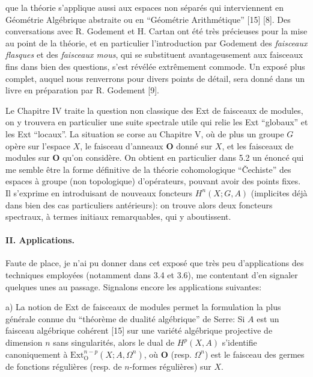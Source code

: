 
que la théorie s'applique aussi aux espaces non séparés qui interviennent en
Géométrie Algébrique abstraite ou en ``Géométrie Arithmétique'' [15] [8]. Des
conversations avec R. Godement et H. Cartan ont été très précieuses pour la
mise au point de la théorie, et en particulier l'introduction par Godement des
\emph{faisceaux flasques} et des \emph{faisceaux mous}, qui se substituent
avantageusement aux faisceaux fins dans bien des questions, s'est révélée
extrêmement commode. Un exposé plus complet, auquel nous renverrons pour divers
points de détail, sera donné dans un livre en préparation par R. Godement [9].

Le Chapitre IV traite la question non classique des Ext de faisceaux de
modules, on y trouvera en particulier une suite spectrale utile qui relie les
Ext ``globaux'' et les Ext ``locaux''.
La situation se corse au Chapitre V, où de plus un groupe $G$ opère sur
l'espace $X$, le faisceau d'anneaux $\mathbf{O}$ donné sur $X$, et les faisceaux de
modules sur $\mathbf{O}$ qu'on considère. On obtient en particulier dans 5.2 un énoncé
qui me semble être la forme définitive de la théorie cohomologique
``Čechiste'' des espaces à groupe (non topologique) d'opérateurs, pouvant avoir
des points fixes. Il s'exprime en introduisant de nouveaux foncteurs
$H^n(X;G,A)$ (implicites déjà dans bien des cas particuliers antérieurs): on
trouve alors deux foncteurs spectraux, à termes initiaux remarquables, qui y
aboutissent.

\paragraph{II. Applications.}
Faute de place, je n'ai pu donner dans cet exposé que très peu d'applications
des techniques employées (notamment dans 3.4 et 3.6), me contentant d'en
signaler quelques unes au passage. Signalons encore les applications
suivantes:

\par a)
La notion de Ext de faisceaux de modules permet la formulation la plus
générale connue du ``théorème de dualité algébrique'' de Serre: Si $A$ est un
faisceau algébrique cohérent [15] sur une variété algébrique projective de
dimension $n$ sans singularités, alors le dual de $H^p(X,A)$ s'identifie
canoniquement à $\mathrm{Ext}_{\mathrm{O}}^{n-p}(X;A,\Omega^n)$, où $\mathbf{O}$ (resp.
$\Omega^n$) est le faisceau des germes de fonctions régulières (resp. de
$n$-formes régulières) sur $X$.

